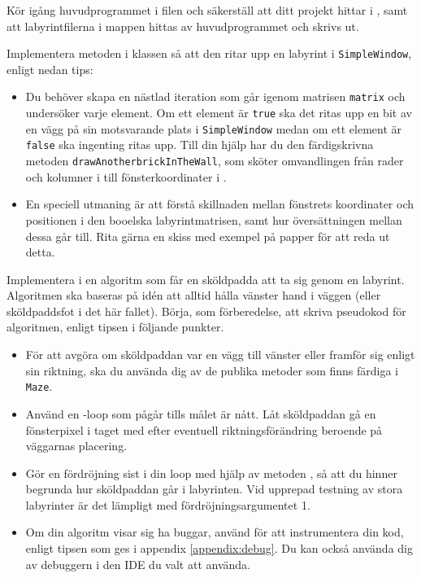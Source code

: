 \Task Kör igång huvudprogrammet i filen  och säkerställ att ditt projekt hittar  i , samt att labyrintfilerna i mappen  hittas av huvudprogrammet och skrivs ut.

\Task Implementera metoden  i klassen  så att den ritar upp en labyrint i \texttt{SimpleWindow}, enligt nedan tips:

\begin{itemize}
\item Du behöver skapa en nästlad iteration som går igenom matrisen \texttt{matrix} och undersöker varje element. Om ett element är \texttt{true} ska det ritas upp en bit av en vägg på sin motsvarande plats i \texttt{SimpleWindow} medan om ett element är \texttt{false} ska ingenting ritas upp.
Till din hjälp har du den färdigskrivna metoden \texttt{drawAnotherbrickInTheWall}, som sköter omvandlingen från rader och kolumner i  till fönsterkoordinater i .

\item En speciell utmaning är att förstå skillnaden mellan fönstrets koordinater och positionen i den booelska labyrintmatrisen, samt hur översättningen mellan dessa går till. Rita gärna en skiss med exempel på papper för att reda ut detta.
\end{itemize}



\Task Implementera i  en algoritm som får en sköldpadda att ta sig genom en labyrint. Algoritmen ska baseras på idén att alltid hålla vänster hand i väggen (eller sköldpaddsfot i det här fallet). Börja, som förberedelse, att skriva pseudokod för algoritmen, enligt tipsen i följande punkter.


\begin{itemize}

\item För att avgöra om sköldpaddan var en vägg till vänster eller framför sig enligt sin riktning, ska du använda dig av de publika metoder som finns färdiga i \texttt{Maze}.

\item Använd en -loop som pågår tills målet är nått. Låt sköldpaddan gå en fönsterpixel i taget med  efter eventuell riktningsförändring beroende på väggarnas placering.

\item Gör en fördröjning sist i din loop med hjälp av metoden , så att du hinner begrunda hur sköldpaddan går i labyrinten. Vid upprepad testning av stora labyrinter är det lämpligt med fördröjningsargumentet 1.

\item Om din algoritm visar sig ha buggar, använd  för att instrumentera din kod, enligt tipsen som ges i appendix \ref{appendix:debug}. Du kan också använda dig av debuggern i den IDE du valt att använda.

\end{itemize}

